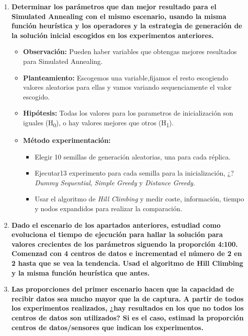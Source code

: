 \documentclass{article}
\begin{document}
\begin{enumerate}
  \item \textbf{Determinar los parámetros que dan mejor resultado para el Simulated Annealing con el mismo escenario, usando la misma función heurística y los operadores y la estrategia de generación de la solución inicial escogidos en los experimentos anteriores.}

 \begin{itemize}
    \item \textbf{Observación:} Pueden haber variables que obtengas mejores resultados para Simulated Annealing.
    \item \textbf{Planteamiento:} Escogemos una variable,fijamos el resto escogiendo valores aleatorios para ellas y vamos variando sequenciamente el valor escogido.
    \item \textbf{Hipótesis:} Todas los valores para los parametros de inicialización son iguales (H\textsubscript{0}), o hay valores mejores que otros (H\textsubscript{1}).
    \item \textbf{Método experimentación:} \begin{itemize}
        \item Elegir 10 semillas de generación aleatorias, una para cada réplica.
        \item Ejecutar13 experimento para cada semilla para la inicialización, ¿? \textit{Dummy Sequential}, \textit{Simple Greedy} y \textit{Distance Greedy}.
        \item Usar el algoritmo de \textit{Hill Climbing} y medir coste, información, tiempo y nodos expandidos para realizar la comparación.
    \end{itemize}
  \end{itemize}


  \item \textbf{Dado el escenario de los apartados anteriores, estudiad como evoluciona el tiempo de ejecución para hallar la solución para valores crecientes de los parámetros siguendo la proporción 4:100. Comenzad con 4 centros de datos e incrementad el número de 2 en 2 hasta que se vea la tendencia. Usad el algoritmo de Hill Climbing y la misma función heurística que antes.}

  \item \textbf{Las proporciones del primer escenario hacen que la capacidad de recibir datos sea mucho mayor que la de captura. A partir de todos los experimentos realizados, ¿hay resultados en los que no todos los centros de datos son utilizados? Si es el caso, estimad la proporción centros de datos/sensores que indican los experimentos.}


\end{enumerate}
\end{document}
